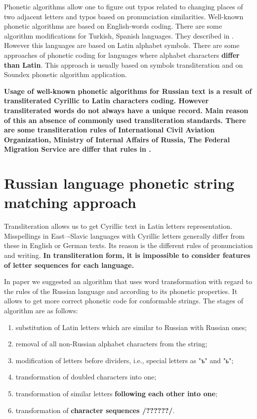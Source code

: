 \documentclass{svproc}
\begin{document}
Phonetic algorithms allow one to figure out typos related to changing places of two adjacent letters and typos based on pronunciation similarities. Well-known phonetic algorithms are based on English-words coding. There are some algorithm modifications for Turkish, Spanish languages. They described in \cite{Alotaibi-2013}. However this languages are based on Latin alphabet symbols. There are some approaches of phonetic coding for languages where alphabet characters\textbf{ differ than Latin}. This approach is usually based on symbols transliteration and on Soundex phonetic algorithm \cite{Soundex} application.

\textbf{Usage of well-known phonetic algorithms for Russian text is a result of transliterated Cyrillic to Latin characters coding. However transliterated words do not always have a unique record. Main reason of this an absence of commonly used transliteration standards. There are some transliteration rules of International Civil Aviation Organization, Ministry of Internal Affairs of Russia, The Federal Migration Service are differ that rules in \cite{GOST-2006}.}

\section{Russian language phonetic string matching approach}
Transliteration allows us to get Cyrillic text in Latin letters representation. Misspellings in East–-Slavic languages with Cyrillic letters generally differ from these in English or German texts. Its reason is the different rules of pronunciation and writing. \textbf{In transliteration form, it is impossible to consider features of letter sequences for each language.}

In paper \cite{Paramonov-2016} we suggested an algorithm that uses word transformation with regard to the rules of the Russian language and according to its phonetic properties. It allows to get more correct phonetic code for conformable strings. The stages of algorithm are as follows:

\begin{enumerate}
\item substitution of Latin letters which are similar to Russian with Russian ones;
\item removal of all non-Russian alphabet characters from the string;
\item modification of letters before dividers, i.e., special letters as "ъ" and "ь";
\item transformation of doubled characters into one;
\item transformation of similar letters \textbf{following each other into one};
\item transformation of \textbf{character sequences /??????/}.
\end{enumerate}
\end{document}
